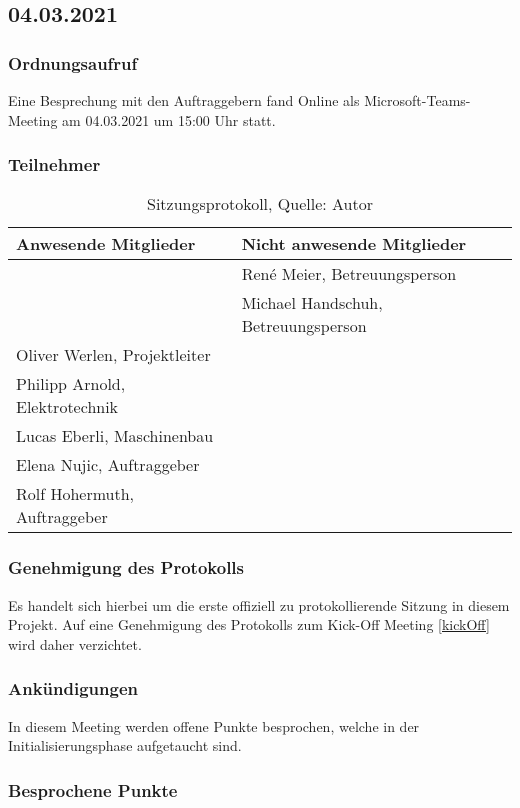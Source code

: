 \subsection{04.03.2021}\label{04.03.2021}
\subsubsection{Ordnungsaufruf}
Eine Besprechung mit den Auftraggebern fand Online als Microsoft-Teams-Meeting am 04.03.2021 um 15:00 Uhr statt.
\subsubsection{Teilnehmer}
\begin{table}[H]
	\setlength\extrarowheight{2pt} %
	\begin{tabularx}{\textwidth}{|X|X|}
		\hline
		\textbf{Anwesende Mitglieder} &  \textbf{Nicht anwesende Mitglieder} \\
		\hline
		& René Meier, Betreuungsperson  \\
		& Michael Handschuh, Betreuungsperson   \\
		Oliver Werlen, Projektleiter &  \\
		Philipp Arnold, Elektrotechnik & \\
		Lucas Eberli, Maschinenbau & \\
		Elena Nujic, Auftraggeber & \\
		Rolf Hohermuth, Auftraggeber & \\
		\hline
	\end{tabularx}
	\caption{ \label{tbl: Teilnehmerliste vom 04.03.2021}Sitzungsprotokoll, Quelle: Autor}
\end{table}
\subsubsection{Genehmigung des Protokolls}
Es handelt sich hierbei um die erste offiziell zu protokollierende Sitzung in diesem Projekt. Auf eine Genehmigung des Protokolls zum Kick-Off Meeting \ref{kickOff} wird daher verzichtet. 
\subsubsection{Ankündigungen}
In diesem Meeting werden offene Punkte besprochen, welche in der Initialisierungsphase aufgetaucht sind. 
\subsubsection{Besprochene Punkte}
